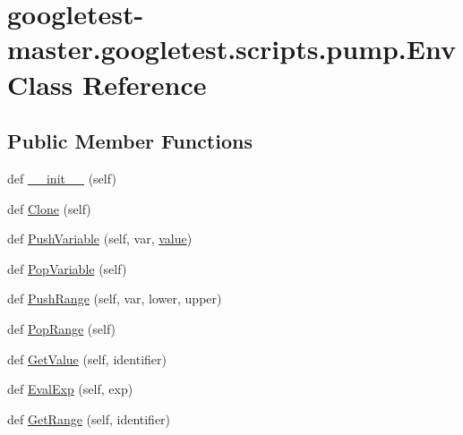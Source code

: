 \hypertarget{classgoogletest-master_1_1googletest_1_1scripts_1_1pump_1_1_env}{}\section{googletest-\/master.googletest.\+scripts.\+pump.\+Env Class Reference}
\label{classgoogletest-master_1_1googletest_1_1scripts_1_1pump_1_1_env}
\subsection*{Public Member Functions}
\begin{DoxyCompactItemize}
\item 
def \mbox{\hyperlink{classgoogletest-master_1_1googletest_1_1scripts_1_1pump_1_1_env_a034d5ad21502eb6bcfe43725cc0b684f}{\+\_\+\+\_\+init\+\_\+\+\_\+}} (self)
\item 
def \mbox{\hyperlink{classgoogletest-master_1_1googletest_1_1scripts_1_1pump_1_1_env_a6bb538e34962d61ba716f98077a4a887}{Clone}} (self)
\item 
def \mbox{\hyperlink{classgoogletest-master_1_1googletest_1_1scripts_1_1pump_1_1_env_a5582b13384c767bbb0d28afdcd5e48c9}{Push\+Variable}} (self, var, \mbox{\hyperlink{_obj__test_2lib_2googletest-master_2googlemock_2test_2gmock-matchers__test_8cc_a337b8a670efc0b086ad3af163f3121b6}{value}})
\item 
def \mbox{\hyperlink{classgoogletest-master_1_1googletest_1_1scripts_1_1pump_1_1_env_aafa22113d08699441965da2656c428d7}{Pop\+Variable}} (self)
\item 
def \mbox{\hyperlink{classgoogletest-master_1_1googletest_1_1scripts_1_1pump_1_1_env_a770a40f99e4dc4ec17485989b68c4ee1}{Push\+Range}} (self, var, lower, upper)
\item 
def \mbox{\hyperlink{classgoogletest-master_1_1googletest_1_1scripts_1_1pump_1_1_env_aac5574bf6336b1efe5c016d7d08c6622}{Pop\+Range}} (self)
\item 
def \mbox{\hyperlink{classgoogletest-master_1_1googletest_1_1scripts_1_1pump_1_1_env_a6f103b2329eea8aa3f59adb2c2e988d4}{Get\+Value}} (self, identifier)
\item 
def \mbox{\hyperlink{classgoogletest-master_1_1googletest_1_1scripts_1_1pump_1_1_env_a72b2a41c21c768c18f3a380dba43b44c}{Eval\+Exp}} (self, exp)
\item 
def \mbox{\hyperlink{classgoogletest-master_1_1googletest_1_1scripts_1_1pump_1_1_env_ae65d3b73d7f972933b6ee87dcc3f3532}{Get\+Range}} (self, identifier)
\end{DoxyCompactItemize}
